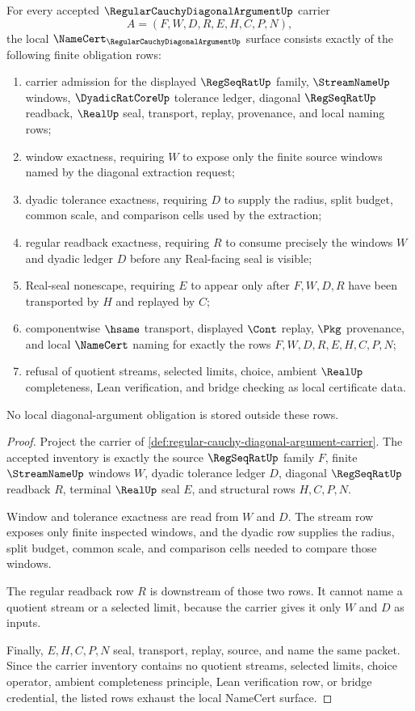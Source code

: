 \begin{theorem}
\label{thm:regular-cauchy-diagonal-argument-namecert-obligations}
For every accepted $\RegularCauchyDiagonalArgumentUp$ carrier
$$
A=(F,W,D,R,E,H,C,P,N),
$$
the local $\NameCert_{\RegularCauchyDiagonalArgumentUp}$ surface consists exactly of the following finite obligation rows:
\begin{enumerate}
\item carrier admission for the displayed $\RegSeqRatUp$ family, $\StreamNameUp$ windows, $\DyadicRatCoreUp$ tolerance ledger, diagonal $\RegSeqRatUp$ readback, $\RealUp$ seal, transport, replay, provenance, and local naming rows;
\item window exactness, requiring $W$ to expose only the finite source windows named by the diagonal extraction request;
\item dyadic tolerance exactness, requiring $D$ to supply the radius, split budget, common scale, and comparison cells used by the extraction;
\item regular readback exactness, requiring $R$ to consume precisely the windows $W$ and dyadic ledger $D$ before any Real-facing seal is visible;
\item Real-seal nonescape, requiring $E$ to appear only after $F,W,D,R$ have been transported by $H$ and replayed by $C$;
\item componentwise $\hsame$ transport, displayed $\Cont$ replay, $\Pkg$ provenance, and local $\NameCert$ naming for exactly the rows $F,W,D,R,E,H,C,P,N$;
\item refusal of quotient streams, selected limits, choice, ambient $\RealUp$ completeness, Lean verification, and bridge checking as local certificate data.
\end{enumerate}
No local diagonal-argument obligation is stored outside these rows.
\end{theorem}
\begin{proof}
Project the carrier of \autoref{def:regular-cauchy-diagonal-argument-carrier}. The accepted inventory is exactly the source $\RegSeqRatUp$ family $F$, finite $\StreamNameUp$ windows $W$, dyadic tolerance ledger $D$, diagonal $\RegSeqRatUp$ readback $R$, terminal $\RealUp$ seal $E$, and structural rows $H,C,P,N$.

Window and tolerance exactness are read from $W$ and $D$. The stream row exposes only finite inspected windows, and the dyadic row supplies the radius, split budget, common scale, and comparison cells needed to compare those windows.

The regular readback row $R$ is downstream of those two rows. It cannot name a quotient stream or a selected limit, because the carrier gives it only $W$ and $D$ as inputs.

Finally, $E,H,C,P,N$ seal, transport, replay, source, and name the same packet. Since the carrier inventory contains no quotient streams, selected limits, choice operator, ambient completeness principle, Lean verification row, or bridge credential, the listed rows exhaust the local NameCert surface.
\end{proof}

